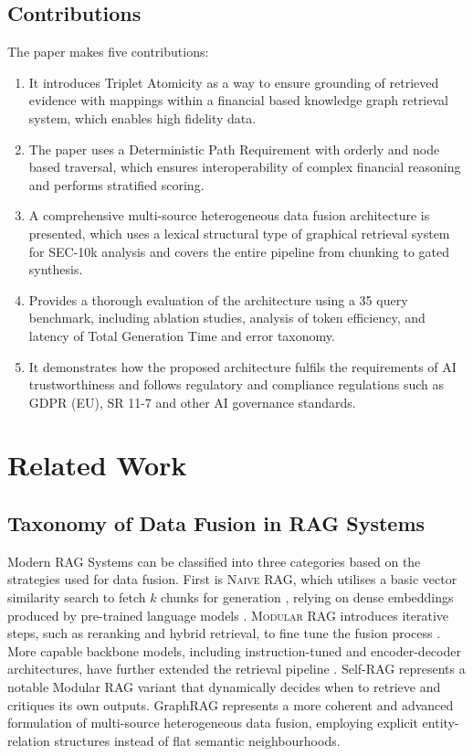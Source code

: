 \documentclass[conference]{IEEEtran}
\begin{document}
\subsection*{Contributions}
The paper makes five contributions:
\begin{enumerate}
  \item It introduces Triplet Atomicity as a way to ensure grounding of retrieved evidence with mappings within a financial based knowledge graph retrieval system, which enables high fidelity data.
  \item The paper uses a Deterministic Path Requirement with orderly and node based traversal, which ensures interoperability of complex financial reasoning and performs stratified scoring.
  \item A comprehensive multi-source heterogeneous data fusion architecture is presented, which uses a lexical structural type of graphical retrieval system for SEC-10k analysis and covers the entire pipeline from chunking to gated synthesis.
  \item Provides a thorough evaluation of the architecture using a 35 query benchmark, including ablation studies, analysis of token efficiency, and latency of Total Generation Time and error taxonomy.
  \item It demonstrates how the proposed architecture fulfils the requirements of AI trustworthiness and follows regulatory and compliance regulations such as GDPR (EU), SR 11-7 and other AI governance standards.
\end{enumerate}

\section{Related Work}
\subsection{Taxonomy of Data Fusion in RAG Systems}
Modern RAG Systems can be classified into three categories based on the strategies used for data fusion. First is \textsc{Naive RAG}, which utilises a basic vector similarity search to fetch $k$ chunks for generation \cite{lewis2020rag}, relying on dense embeddings produced by pre-trained language models \cite{attention2017,bert2019,sbert2019}. \textsc{Modular RAG} introduces iterative steps, such as reranking and hybrid retrieval, to fine tune the fusion process \cite{karpukhin2020dpr,colbert2020,splade2021,hyde2023,monoT52020,rankgpt2023}. More capable backbone models, including instruction-tuned and encoder-decoder architectures, have further extended the retrieval pipeline \cite{roberta2019,t52020,instructiontuning2022}. Self-RAG \cite{selfrag2023} represents a notable Modular RAG variant that dynamically decides when to retrieve and critiques its own outputs. GraphRAG \cite{edge2024graphrag} represents a more coherent and advanced formulation of multi-source heterogeneous data fusion, employing explicit entity-relation structures instead of flat semantic neighbourhoods.
\end{document}
